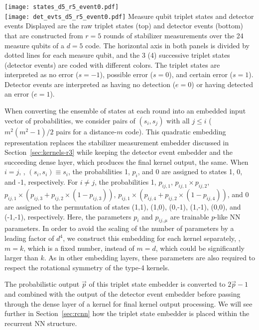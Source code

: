 \begin{figure*}[htb]
\centering
\texttt{[image: states\_d5\_r5\_event0.pdf]} \\
\texttt{[image: det\_evts\_d5\_r5\_event0.pdf]}
\ccaption
{Measure qubit triplet states and detector events}
{
Displayed are the raw triplet states (top) and detector events (bottom) that are constructed from $r=5$ rounds of stabilizer measurements over the 24 measure qubits of a $d=5$ code. The horizontal axis in both panels is divided by dotted lines for each measure qubit, and the 3 (4) successive triplet states (detector events) are coded with different colors. The triplet states are interpreted as no error ($s=-1$), possible error ($s=0$), and certain error ($s=1$). Detector events are interpreted as having no detection ($e=0$) or having detected an error ($e=1$).
}
\label{fig:d5r5states}
\end{figure*}

When converting the ensemble of states at each round into an embedded input vector of probabilities, we consider pairs of $(s_i, s_j)$ with all $j\leq i$ ($m^2(m^2-1)/2$ pairs for a distance-$m$ code). This quadratic embedding representation replaces the stabilizer measurement embedder discussed in Section~\ref{sec:kernels-r3} while keeping the detector event embedder and the succeeding dense layer, which produces the final kernel output, the same. When $i=j$, \ie, $(s_i, s_i)\equiv s_i$, the probabilities 1, $p_i$, and 0 are assigned to states 1, 0, and -1, respectively. For $i \neq j$, the probabilities
1,
$p_{ij,1}$,
$p_{ij,1} \times p_{ij,2}$,
$p_{ij,1} \times \left(p_{ij,3} + p_{ij,2} \times \left(1-p_{ij,3}\right)\right)$,
$p_{ij,1} \times \left(p_{ij,4} + p_{ij,2} \times \left(1-p_{ij,4}\right)\right)$,
and 0
are assigned to the permutation of states (1,1), (1,0), (0,-1), (1,-1), (0,0), and (-1,-1), respectively.
Here, the parameters $p_i$ and $p_{ij,\mu}$ are trainable $p$-like NN parameters. In order to avoid the scaling of the number of parameters by a leading factor of $d^4$, we construct this embedding for each kernel separately, \ie, $m=k$, which is a fixed number, instead of $m=d$, which could be significantly larger than $k$. As in other embedding layers, these parameters are also required to respect the rotational symmetry of the type-4 kernels.

The probabilistic output $\vec{p}$ of this triplet state embedder is converted to $2\vec{p}-1$ and combined with the output of the detector event embedder before passing through the dense layer of a kernel for final kernel output processing. We will see further in Section~\ref{sec:rcnn} how the triplet state embedder is placed within the recurrent NN structure.
